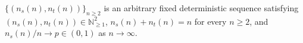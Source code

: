 \(\{(n_s(n),n_t(n))\}_{n\ge2}\) is an arbitrary fixed deterministic sequence satisfying \((n_s(n),n_t(n))\in\mathbb N_{\ge1}^{2}\), \(n_s(n)+n_t(n)=n\) for every \(n\ge2\), and \(n_s(n)/n\to p\in(0,1)\) as \(n\to\infty\).